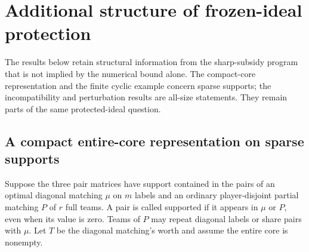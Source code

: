 \documentclass[11pt]{article}
\theoremstyle{remark}
\begin{document}
\section{Additional structure of frozen-ideal protection}\label{anc:section}
The results below retain structural information from the sharp-subsidy
program that is not implied by the numerical bound alone. The compact-core
representation and the finite cyclic example concern sparse supports;
the incompatibility and perturbation results are all-size statements.
They remain parts of the same protected-ideal question.

\subsection{A compact entire-core representation on sparse supports}
Suppose the three pair matrices have support contained in the pairs of
an optimal diagonal matching $\mu$ on $m$ labels and an ordinary
player-disjoint partial matching $P$ of $r$ full teams. A pair is called
supported if it appears in $\mu$ or $P$, even when its value is zero.
Teams of $P$ may repeat diagonal labels or share pairs with $\mu$.
Let $T$ be the diagonal matching's worth and assume the entire core is
nonempty.
\end{document}
